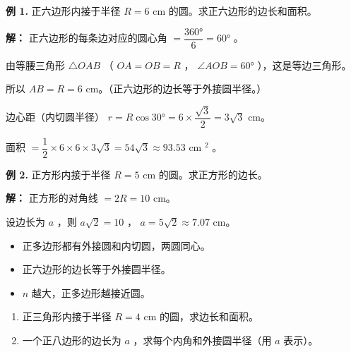 \begin{workedexamples}


\textbf{例 1.} 正六边形内接于半径 $R = 6$ cm 的圆。求正六边形的边长和面积。

\textbf{解：}
正六边形的每条边对应的圆心角 $= \dfrac{360°}{6} = 60°$ 。

由等腰三角形 $\triangle OAB$ （ $OA = OB = R$ ， $\angle AOB = 60°$ ），这是等边三角形。

所以 $AB = R = 6$ cm。（正六边形的边长等于外接圆半径。）

边心距（内切圆半径） $r = R \cos 30° = 6 \times \dfrac{\sqrt{3}}{2} = 3\sqrt{3}$ cm。

面积 $= \dfrac{1}{2} \times 6 \times 6 \times 3\sqrt{3} = 54\sqrt{3} \approx 93.53$ cm $^2$ 。

\textbf{例 2.} 正方形内接于半径 $R = 5$ cm 的圆。求正方形的边长。

\textbf{解：}
正方形的对角线 $= 2R = 10$ cm。

设边长为 $a$ ，则 $a\sqrt{2} = 10$ ， $a = 5\sqrt{2} \approx 7.07$ cm。

\end{workedexamples}

\begin{keytakeaway}


\begin{itemize}
  \item 正多边形都有外接圆和内切圆，两圆同心。
  \item 正六边形的边长等于外接圆半径。
  \item $n$ 越大，正多边形越接近圆。
\end{itemize}


\end{keytakeaway}

\begin{practice}


\begin{enumerate}
  \item 正三角形内接于半径 $R = 4$ cm 的圆，求边长和面积。
  \item 一个正八边形的边长为 $a$ ，求每个内角和外接圆半径（用 $a$ 表示）。
\end{enumerate}


\end{practice}



